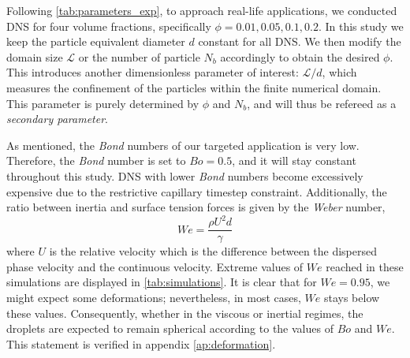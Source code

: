 Following \ref{tab:parameters_exp}, to approach real-life applications, we conducted DNS for four volume fractions, specifically $\phi = 0.01,0.05,0.1,0.2$.
In this study we keep the particle equivalent diameter $d$ constant for all DNS. 
We then modify the domain size $\mathcal{L}$ or the number of particle $N_b$ accordingly to obtain the desired $\phi$. 
This introduces another dimensionless parameter of interest: $\mathcal{L}/d$, which measures the confinement of the particles within the finite numerical domain. 
This parameter is purely determined by $\phi$ and $N_b$, and will thus be refereed as a \textit{secondary parameter}.

As mentioned, the \textit{Bond} numbers of our targeted application is very low.
Therefore, the \textit{Bond} number is set to $Bo = 0.5$, and it will stay constant throughout this study.
DNS with lower \textit{Bond} numbers become excessively expensive due to the restrictive capillary timestep constraint. 
Additionally, the ratio between inertia and surface tension forces is given by the \textit{Weber} number, 
\begin{equation*}
    We = \frac{\rho U^2d}{\gamma}%
\end{equation*}
where $U$ is the relative velocity which is the difference between the dispersed phase velocity and the continuous velocity. %
Extreme values of $We$ reached in these simulations are displayed in \ref{tab:simulations}. 
It is clear that for $We=0.95$, we might expect some deformations; nevertheless, in most cases, $We$ stays below these values. 
Consequently, whether in the viscous or inertial regimes, the droplets are expected to remain spherical according to the values of $Bo$ and $We$.
This statement is verified in appendix \ref{ap:deformation}.%


